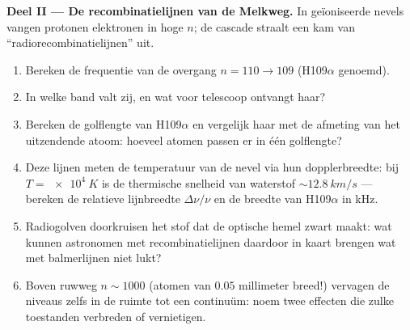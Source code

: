 \begin{problem}
\medskip\noindent\textbf{Deel II --- De recombinatielijnen van de
Melkweg.}
In geïoniseerde nevels vangen protonen elektronen in hoge $n$; de cascade
straalt een kam van ``radiorecombinatielijnen'' uit.
\begin{enumerate}[resume]
  \item Bereken de frequentie van de overgang $n = 110 \to 109$
        (H109$\alpha$ genoemd).
  \item In welke band valt zij, en wat voor telescoop ontvangt haar?
  \item Bereken de golflengte van H109$\alpha$ en vergelijk haar met de
        afmeting van het uitzendende atoom: hoeveel atomen passen er in
        één golflengte?
  \item Deze lijnen meten de temperatuur van de nevel via hun
        dopplerbreedte: bij $T = \qty{e4}{K}$ is de thermische snelheid
        van waterstof $\sim\qty{12.8}{km/s}$ --- bereken de relatieve
        lijnbreedte $\Delta\nu/\nu$ en de breedte van H109$\alpha$ in
        kHz.
  \item Radiogolven doorkruisen het stof dat de optische hemel zwart
        maakt: wat kunnen astronomen met recombinatielijnen daardoor in
        kaart brengen wat met balmerlijnen niet lukt?
  \item Boven ruwweg $n \sim 1000$ (atomen van $0.05$ millimeter breed!)
        vervagen de niveaus zelfs in de ruimte tot een continuüm: noem
        twee effecten die zulke toestanden verbreden of vernietigen.
\end{enumerate}


\end{problem}
